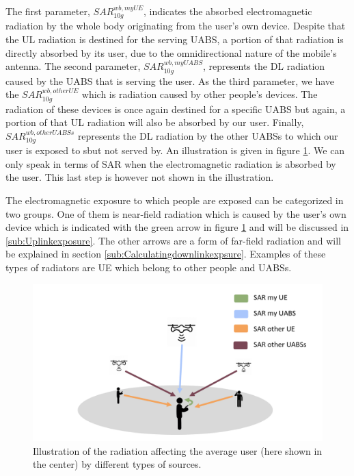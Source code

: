 The first parameter, $SAR^{wb,myUE}_{10g}$, indicates the absorbed electromagnetic radiation by the whole body originating from the user's own device. Despite that the 
\gls{UL} radiation is destined for the serving \gls{UABS}, a portion of that radiation is directly absorbed by its user, due to the omnidirectional nature of the mobile's antenna.
The second parameter, $SAR^{wb,myUABS}_{10g}$, represents the \gls{DL} radiation caused by the \gls{UABS} that is serving the user.
As the third parameter, we have the $SAR^{wb,otherUE}_{10g}$ which is radiation caused by other people's devices. The radiation of these devices is once again 
destined for a specific \gls{UABS} but again, a portion of that \gls{UL} radiation will also be absorbed by our user.
Finally, $SAR^{wb,otherUABSs}_{10g}$ represents the \gls{DL} radiation by the other \gls{UABS}s to which our user is exposed to sbut not served by.
An illustration is given in figure \ref{fig:networkIllustration}.
We can only speak in terms of \gls{SAR}
  when the electromagnetic radiation is absorbed by the user. This last step is however not shown in the illustration.

The electromagnetic exposure to which people are exposed can be categorized in two groups. One of them is near-field radiation which is caused 
by the user's own device which is indicated with the green arrow in figure \ref{fig:networkIllustration} and will be discussed in \ref{sub:Uplinkexposure}.
The other arrows are a form of far-field radiation and will be explained in section \ref{sub:Calculatingdownlinkexpsure}. 
Examples of these types of radiators are \gls{UE} which belong to other people and \gls{UABS}s. 

\begin{figure}[h!]
\centering
  \includegraphics[width=\textwidth/3*2]{../images/networkIllustrationSARSources.png}
  \caption{Illustration of the radiation affecting the average user (here shown in the center) by different types of sources. }
  \label{fig:networkIllustration}
\end{figure}



